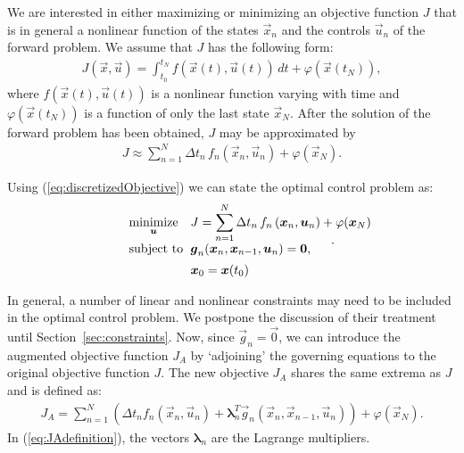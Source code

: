 \documentclass[twocolumn,numbook]{svjour3}          %
\makeatletter
\newcommand{\integral}[1]{\int_{t_0}^{t_N} {#1} \, dt}
\newcommand{\fsum}[3]{\sum_{#1}^{#2}{#3}}
\def\u{{\vec u}}
\def\x{{\vec x}}
\def\p{{\vec{g}}}
\def\0{{\vec 0}}
\def\blambda{{\pmb{\lambda}}}%
\def\M{{\varphi}}
\def\F{f}
\def\myobj{J}
\def\minim{\mathop{\hbox{\rm minimize}}}
\def\minimize#1{{\displaystyle\minim_{#1}}}
\def\subject{\mbox{\rm subject to}}
\def\newproblem#1#2#3#4#5{%
   {\begin{tabular*}{0.47\textwidth}
    {@{}l@{\extracolsep{\fill}}l@{\extracolsep{6pt}}l@{\extracolsep{\fill}}c@{}}
      #1 & $\minimize{#2}$ & $#3$ & $ $ \\[5pt]
         & $\subject$      & $#4$ & $ $ \\[5pt]
         & & $#5$ & $ $
    \end{tabular*}}}
\makeatother
\begin{document}
We are interested in either maximizing or minimizing
an objective function $\myobj$ that is in general a nonlinear function of the
states $\x_n$ and the controls $\u_n$ of the forward problem. We
assume that $\myobj$ has the following form:
%
\begin{align}
  \label{eq:continuousObjective}
  \myobj(\x, \u) = \integral{\F\left ( \x(t), \u(t) \right )} + \M(\x(t_N)),
\end{align}
%
where $\F(\x(t), \u(t))$ is a nonlinear function varying with time and $\M(\x(t_N))$ is a
function of only the last state $\x_N$. After the solution of the
forward problem has been obtained, $\myobj$ may be approximated by
%
\begin{align}
  \label{eq:discretizedObjective}
  \myobj \approx \fsum{n=1}{N}{ \Delta t_n \, \F_n \left ( \x_n, \u_n \right ) + \M(\x_N) }.
\end{align}
%

Using (\ref{eq:discretizedObjective}) we can state the optimal control
problem as:
\[
   \newproblem{}{\u}{\displaystyle \myobj =
  \sum_{n=1}^N \Delta t_n \, \F_n \left ( \x_n, \u_n \right ) + \M(\x_N) }
                 {\p_n(\x_n, \x_{n-1}, \u_n) = \0,}
                 {\x_0 = \x(t_0)}.
\]

In general, a number of linear and nonlinear constraints may need to be included in the optimal
control problem. We postpone the discussion of their treatment until Section~\ref{sec:constraints}. 
Now, since $\p_n = \0$, we can introduce the augmented objective function $\myobj_A$ by `adjoining' 
the governing equations to the original objective function $\myobj$. The new objective $\myobj_A$ shares
the same extrema as $\myobj$ and is defined as:
%
\begin{align}
\label{eq:JAdefinition}
  \myobj_A = \fsum{n=1}{N}{\left ( \Delta t_n \F_n(\x_n, \u_n)
      + \blambda^T_n \p_n (\x_n, \x_{n-1}, \u_n)  \right )}
   + \M(\x_N).
\end{align}
%
In (\ref{eq:JAdefinition}), the vectors $\blambda_n$ are the Lagrange multipliers.
\end{document}
